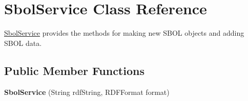 \hypertarget{classorg_1_1sbolstandard_1_1rdf_1_1_sbol_service}{
\section{SbolService Class Reference}
\label{classorg_1_1sbolstandard_1_1rdf_1_1_sbol_service}
}


\hyperlink{classorg_1_1sbolstandard_1_1rdf_1_1_sbol_service}{SbolService} provides the methods for making new SBOL objects and adding SBOL data.  


\subsection*{Public Member Functions}
\begin{DoxyCompactItemize}
\item 
\hypertarget{classorg_1_1sbolstandard_1_1rdf_1_1_sbol_service_a0a1f866468d00d778525ac0b65246934}{
{\bfseries SbolService} (String rdfString, RDFFormat format)}
\label{classorg_1_1sbolstandard_1_1rdf_1_1_sbol_service_a0a1f866468d00d778525ac0b65246934}


\end{DoxyCompactItemize}
